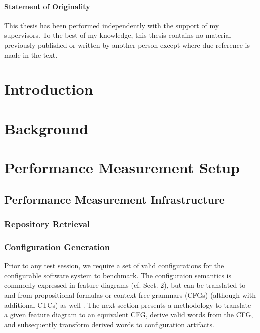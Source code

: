 \documentclass[
	12pt,
	a4paper,
	oneside,
	openright
]{book}
\begin{document}
\newpage
\thispagestyle{empty}

\subsubsection*{Statement of Originality}

This thesis has been performed independently with the support of my
supervisors. To the best of my knowledge, this thesis contains no material previously published or written
by another person except where due reference is made in the text.

\vspace{1.3cm}


\tableofcontents

\mainmatter
\chapter{Introduction}\label{chapter:1}
\setcounter{page}{1}


\chapter{Background}\label{chapter:2}


\chapter{Performance Measurement Setup}\label{chapter:3}


\section{Performance Measurement Infrastructure}

\subsection{Repository Retrieval}
\subsection{Configuration Generation}
Prior to any test session, we require a set of valid configurations for the
configurable software system to benchmark. The configuraion semantics is
commonly expressed in feature diagrams (cf. Sect. 2), but can be translated to
and from propositional formulas or context-free grammars (CFGs) (although with
additional CTCs) as well \citep{batory_feature_2005}. The next section presents
a methodology to translate a given feature diagram to an equivalent CFG, derive
valid words from the CFG, and subsequently transform derived words to
configuration artifacts.
\end{document}
